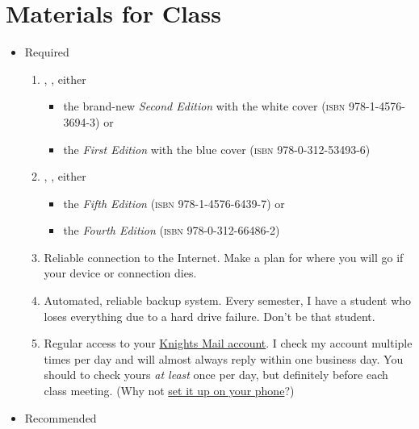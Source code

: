 \documentclass[11pt, twosides]{amsart}	%
\begin{document}
\clearpage
\section{Materials for Class}
\begin{itemize}
	\item Required
		\begin{enumerate}
\item \citeauthor{downs:2010aa}, , either
\begin{itemize}
	\item the brand-new \emph{Second Edition} with the white cover (\textsc{isbn} 978-1-4576-3694-3) or
	\item the \emph{First Edition} with the blue cover (\textsc{isbn} 978-0-312-53493-6)
\end{itemize}
		\item \citeauthor{lunsford:2010aa}, , either
		\begin{itemize}
			\item the \emph{Fifth Edition} (\textsc{isbn} 978-1-4576-6439-7) or
			\item the \emph{Fourth Edition} (\textsc{isbn} 978-0-312-66486-2)%
		\end{itemize}%
		\item Reliable connection to the Internet. Make a plan for where you will go if your device or connection dies.
		\item Automated, reliable backup system. Every semester, I have a student who loses everything due to a hard drive failure. Don't be that student.
		\item Regular access to your \href{http://www.outlook.com/knights.ucf.edu}{Knights Mail account}. I check my account multiple times per day and will almost always reply within one business day. You should to check yours \emph{at least} once per day, but definitely before each class meeting. (Why not \href{http://www.students.graduate.ucf.edu/knights_email_for_mobile/}{set it up on your phone}?)
	\end{enumerate}
	\item Recommended
	\begin{enumerate}

\end{enumerate}
\end{itemize}
\end{document}
